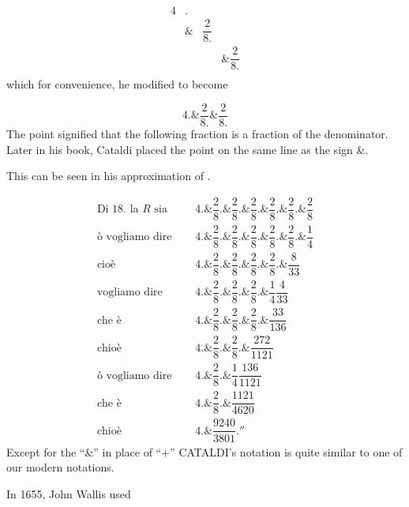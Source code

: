 {{\setlength\arraycolsep{2pt}
\[
\begin{array}{llll}
4 & .  &               &\\
  & \& & \dfrac{2}{8.}  &\\
  &    &               & \& \dfrac{2}{8.}\\
\end{array}
\]
}
which for convenience, he modified to become

\[4.\&\frac{2}{8.}\&\frac{2}{8.}\]
The point signified that the following fraction is a fraction of the denominator. Later in his book, Cataldi placed the point on the same line as the sign \&. 

This can be seen in his approximation of .

{\def\arraystretch{3}
\def\temp{.\&\dfrac{2}{8}}
\[
\begin{array}{rl} 
\text{Di 18. la $R$ sia }\quad  & 4\temp\temp\temp \temp \temp\temp\\
\text{\`o vogliamo dire }\quad  & 4\temp\temp\temp\temp\temp.\&\dfrac{1}{4}\\
\text{cio\`e}\quad              & 4\temp\temp\temp\temp.\&\dfrac{8}{33}\\
\text{vogliamo dire}\quad       & 4\temp\temp\temp.\&\dfrac{1}{4}\dfrac{4}{33}\\
\text{che \`e}\quad             & 4\temp\temp\temp.\&\dfrac{33}{136}\\
\text{chio\`e}\quad             & 4\temp\temp.\&\dfrac{272}{1121}\\
\text{\`o vogliamo dire}\quad   & 4\temp.\&\dfrac{1}{4}\dfrac{136}{1121}\\
\text{che \`e}\quad             & 4\temp.\&\dfrac{1121}{4620}\\
\text{chio\`e}\quad             & 4.\&\dfrac{9240}{3801}.''
\end{array}
\]
}
Except for the \enquote{\&} in place of \enquote{+} \textsc{CATALDI}'s notation is quite similar to one of our modern notations.


In 1655, John Wallis used

}
